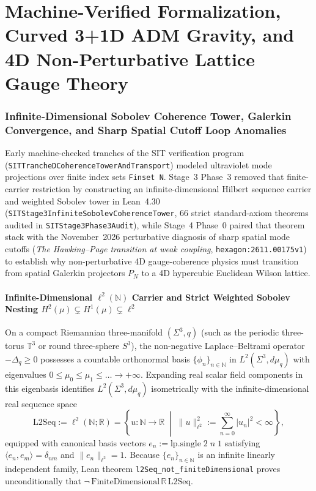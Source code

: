 \part{Machine-Verified Formalization, Curved 3+1D ADM Gravity, and 4D Non-Perturbative Lattice Gauge Theory}

\section{Infinite-Dimensional Sobolev Coherence Tower, Galerkin Convergence, and Sharp Spatial Cutoff Loop Anomalies}
\label{sec:stage3-sobolev}

Early machine-checked tranches of the SIT verification program (\texttt{SITTranche\allowbreak{}DCoherence\allowbreak{}Tower\allowbreak{}And\allowbreak{}Transport}) modeled ultraviolet mode projections over finite index sets \texttt{Finset N}. Stage~3 Phase~3 removed that finite-carrier restriction by constructing an infinite-dimensional Hilbert sequence carrier and weighted Sobolev tower in Lean~4.30 (\texttt{SITStage3\allowbreak{}Infinite\allowbreak{}Sobolev\allowbreak{}Coherence\allowbreak{}Tower}, $66$ strict standard-axiom theorems audited in \texttt{SITStage3Phase3Audit}), while Stage~4 Phase~0 paired that theorem stack with the November~2026 perturbative diagnosis of sharp spatial mode cutoffs (\emph{The Hawking--Page transition at weak coupling}, \texttt{hexagon:2611.00175v1}) to establish why non-perturbative 4D gauge-coherence physics must transition from spatial Galerkin projectors $P_N$ to a 4D hypercubic Euclidean Wilson lattice.

\subsection{Infinite-Dimensional $\ell^2(\mathbb{N})$ Carrier and Strict Weighted Sobolev Nesting $H^2(\mu) \subsetneq H^1(\mu) \subsetneq \ell^2$}

On a compact Riemannian three-manifold $(\Sigma^3, q)$ (such as the periodic three-torus $\mathbb{T}^3$ or round three-sphere $S^3$), the non-negative Laplace--Beltrami operator $-\Delta_q \ge 0$ possesses a countable orthonormal basis $\{\phi_n\}_{n\in\mathbb{N}}$ in $L^2(\Sigma^3, d\mu_q)$ with eigenvalues $0 \le \mu_0 \le \mu_1 \le \dots \to +\infty$. Expanding real scalar field components in this eigenbasis identifies $L^2(\Sigma^3, d\mu_q)$ isometrically with the infinite-dimensional real sequence space
\begin{equation}
\mathrm{L2Seq} := \ell^2(\mathbb{N}; \mathbb{R})
= \left\{ u : \mathbb{N} \to \mathbb{R} \;\middle|\; \|u\|_{\ell^2}^2 := \sum_{n=0}^\infty |u_n|^2 < \infty \right\},
\label{eq:L2Seq_def}
\end{equation}
equipped with canonical basis vectors $e_n := \mathrm{lp.single}\;2\;n\;1$ satisfying $\langle e_n, e_m\rangle = \delta_{nm}$ and $\|e_n\|_{\ell^2} = 1$. Because $\{e_n\}_{n\in\mathbb{N}}$ is an infinite linearly independent family, Lean theorem \texttt{l2\allowbreak{}Seq\_\allowbreak{}not\_\allowbreak{}finite\allowbreak{}Dimensional} proves unconditionally that $\neg\,\mathrm{FiniteDimensional}\,\mathbb{R}\,\mathrm{L2Seq}$.

